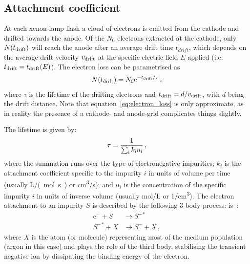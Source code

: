 \documentclass[a4paper,11pt]{article}
\providecommand*{\eu}%
{\ensuremath{\mathrm{e}}}
\begin{document}
\subsection{Attachment coefficient}
\label{subsec:attachment}
At each xenon-lamp flash a cloud of electrons is emitted from the cathode and drifted towards the anode. Of the $N_0$ electrons extracted at the cathode, only $N(t_{\rm drift})$ will reach the anode after an average drift time $t_{drift}$, which depends on the average drift velocity $v_{\rm drift}$ at the specific electric field $E$ applied (i.e. $t_{\rm drift} = t_{\rm drift}(E)$). The electron loss can be parametrised as
\begin{equation}
    N(t_{\rm drift}) = N_0 \eu^{-t_{\rm drift}/\tau} \,,
    \label{eq:electron_loss}
\end{equation}
\noindent where $\tau$ is the lifetime of the drifting electrons and $t_{\rm drift} = d/v_{\rm drift}$, with $d$ being the drift distance. Note that equation~\ref{eq:electron_loss} is only approximate, as in reality the presence of a cathode- and anode-grid complicates things slightly.

The lifetime is given by: 
\begin{equation}
    \tau = \frac{1}{\sum_{\rm i} k_{\rm i} n_{\rm i}} \, ,
    \label{eq:attachement}
\end{equation}
\noindent where the summation runs over the type of electronegative impurities; $k_i$ is the attachment coefficient specific to the impurity $i$ in units of volume per time (usually \si{\liter /(mol.s)} or \si{cm^3/s}); and $n_i$ is the concentration of the specific impurity $i$ in units of inverse volume (usually \si{mol/\liter} or \si{1/cm^3}).  
The electron attachment to an impurity $S$ is described by the following 3-body process: is~\cite{EmissionDetectorsBook}:
\begin{equation}
    \begin{aligned}
    \eu^- + S      & \rightarrow {S^-}^* \\
    {S^-}^* + X & \rightarrow S^- + X \,,
    \end{aligned}
    \label{eq:Block-Broadbury}
\end{equation}
\noindent where $X$ is the atom (or molecule) representing most of the medium population (argon in this case) and plays the role of the third body, stabilising the transient negative ion by dissipating the binding energy of the electron. 
\end{document}

